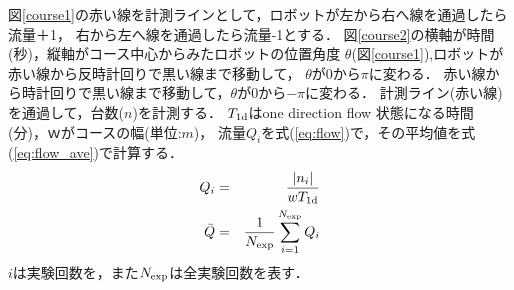 図\ref{course1}の赤い線を計測ラインとして，ロボットが左から右へ線を通過したら流量＋1，
右から左へ線を通過したら流量-1とする．
図\ref{course2}の横軸が時間(秒)，縦軸がコース中心からみたロボットの位置角度
$\theta$(図\ref{course1}),ロボットが赤い線から反時計回りで黒い線まで移動して，
$\theta$が0から$\pi$に変わる．
赤い線から時計回りで黒い線まで移動して，$\theta$が0から$-\pi$に変わる．
計測ライン(赤い線)を通過して，台数($n$)を計測する．
$T_{\rm 1d}$はone direction flow 状態になる時間(分)，$ｗ$がコースの幅(単位:$m$)，
流量$Q_i$を式(\ref{eq:flow})で，その平均値を式(\ref{eq:flow_ave})で計算する．
\vspace{-2mm}
\begin{eqnarray}
Q_i &=& \frac{|n_i|}{wT_{\rm 1d}}
\label{eq:flow} \\
\bar{Q} &=& \frac{1}{N_{\rm exp}}\sum_{i=1}^{N_{\rm exp}} Q_i
\label{eq:flow_ave} 
\end{eqnarray}
$i$は実験回数を，また$N_{\rm exp}$は全実験回数を表す．
